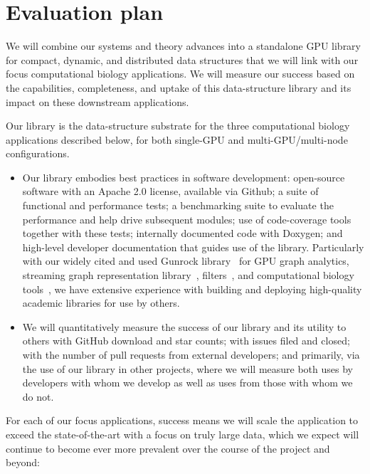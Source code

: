 
\section{Evaluation plan}

 We will combine our systems and theory advances into a standalone GPU library for compact, dynamic, and distributed data structures that we will link with our focus computational biology applications. We will measure our success based on the capabilities, completeness, and uptake of this data-structure library and its impact on these downstream applications.

Our library is the data-structure substrate for the three computational biology applications described below, for both single-GPU and multi-GPU/multi-node configurations.

\begin{itemize}%
  \item Our library embodies best practices in software development: open-source software with an Apache 2.0 license, available via Github; a suite of functional and performance tests; a benchmarking suite to evaluate the performance and help drive subsequent modules; use of code-coverage tools together with these tests; internally documented code with Doxygen; and high-level developer documentation that guides use of the library. Particularly with our widely cited and used Gunrock library~\cite{Wang:2017:GGG} for GPU graph analytics, streaming graph representation library~\cite{pandey2021terrace}, filters~\cite{PandeyBJP17,PandeyCDBFJ21}, and computational biology tools~\cite{PandeyBeJo18,PandeyBeJo17b,PandeyAlBe18,pandey2021variantstore}, we have extensive experience with building and deploying high-quality academic libraries for use by others.
  \item We will quantitatively measure the success of our library and its utility to others with GitHub download and star counts; with issues filed and closed; with the number of pull requests from external developers; and primarily, via the use of our library in other projects, where we will measure both uses by developers with whom we develop as well as uses from those with whom we do not.
\end{itemize}

For each of our focus applications, success means we will scale the application to exceed the state-of-the-art with a focus on truly large data, which we expect will continue to become ever more prevalent over the course of the project and beyond:

